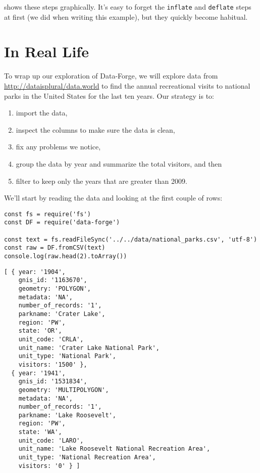  shows these steps graphically.
It's easy to forget the \texttt{inflate} and \texttt{deflate} steps at first
(we did when writing this example),
but they quickly become habitual.


\section{In Real Life}\label{s:dataforge-real}

To wrap up our exploration of Data-Forge,
we will explore data from \url{http://dataisplural/data.world}
to find the annual recreational visits to national parks in the United States for the last ten years.
Our strategy is to:

\begin{enumerate}
\item
  import the data,
\item
  inspect the columns to make sure the data is clean,
\item
  fix any problems we notice,
\item
  group the data by year and summarize the total visitors, and then
\item
  filter to keep only the years that are greater than 2009.
\end{enumerate}

We'll start by reading the data and looking at the first couple of rows:

\begin{verbatim}
const fs = require('fs')
const DF = require('data-forge')

const text = fs.readFileSync('../../data/national_parks.csv', 'utf-8')
const raw = DF.fromCSV(text)
console.log(raw.head(2).toArray())
\end{verbatim}

\begin{verbatim}
[ { year: '1904',
    gnis_id: '1163670',
    geometry: 'POLYGON',
    metadata: 'NA',
    number_of_records: '1',
    parkname: 'Crater Lake',
    region: 'PW',
    state: 'OR',
    unit_code: 'CRLA',
    unit_name: 'Crater Lake National Park',
    unit_type: 'National Park',
    visitors: '1500' },
  { year: '1941',
    gnis_id: '1531834',
    geometry: 'MULTIPOLYGON',
    metadata: 'NA',
    number_of_records: '1',
    parkname: 'Lake Roosevelt',
    region: 'PW',
    state: 'WA',
    unit_code: 'LARO',
    unit_name: 'Lake Roosevelt National Recreation Area',
    unit_type: 'National Recreation Area',
    visitors: '0' } ]
\end{verbatim}


